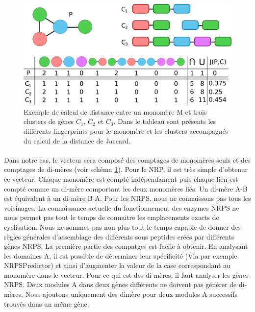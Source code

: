 \documentclass[12pt,french,twoside]{report}
\begin{document}
\begin{figure}[h!]
  \begin{center}
    \includegraphics[width=450px]{Figures/synthese/fingerprints.png}
    \caption{\label{jaccard}Exemple de calcul de distance entre un monomère M et trois clusters de gènes $C_1$, $C_2$ et $C_3$.
    Dans le tableau sont présents les différents fingerprints pour le monomère et les clusters accompagnés du calcul de la distance de Jaccard.}
  \end{center}
\end{figure}

\paragraph{}Dans notre cas, le vecteur sera composé des comptages de monomères seuls et des comptages de di-mères (voir schéma \ref{jaccard}).
Pour le NRP, il est très simple d'obtenur ce vecteur.
Chaque monomère est compté indépendament puis chaque lien est compté comme un di-mère comportant les deux monomères liés.
Un di-mère A-B est équivalent à un di-mère B-A.
Pour les NRPS, nous ne connaissons pas tous les voisinages.
La connaissance actuelle du fonctionnement des enzymes NRPS ne nous permet pas tout le temps de connaitre les emplacements exacts de cyclisation.
Nous ne sommes pas non plus tout le temps capable de donner des règles générales d'assemblage des différents sous peptides créés par différents gènes NRPS.
La première partie des compatges est facile à obtenir.
En analysant les domaines A, il est possible de déterminer leur spécificité (Via par exemple NRPSPredictor) et ainsi d'augmenter la valeur de la case correspondant au monomère dans le vecteur.
Pour ce qui est des di-mères, il faut analyser les gènes NRPS.
Deux modules A dans deux gènes différents ne doivent pas générer de di-mères.
Nous ajoutons uniquement des dimère pour deux modules A successifs trouvés dans un même gène.

\end{document}
